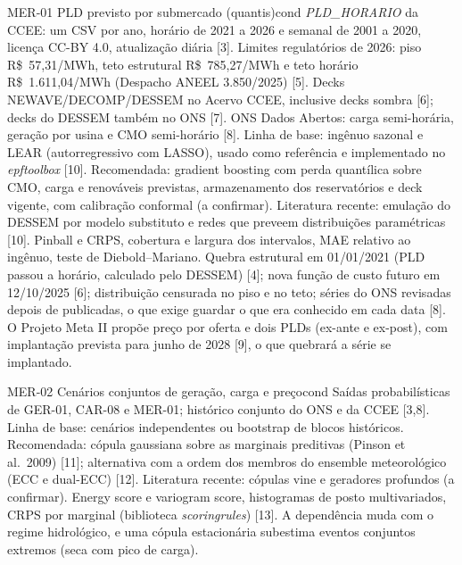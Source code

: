 \begin{ficha}{MER-01 \textperiodcentered{} PLD previsto por submercado (quantis)}{cond}
 \emph{PLD\_HORARIO} da CCEE: um CSV por ano, horário de 2021 a
2026 e semanal de 2001 a 2020, licença CC-BY 4.0, atualização diária [3].
Limites regulatórios de 2026: piso R\$~57,31/MWh, teto estrutural
R\$~785,27/MWh e teto horário R\$~1.611,04/MWh (Despacho ANEEL 3.850/2025)
[5]. Decks NEWAVE/DECOMP/DESSEM no Acervo CCEE, inclusive decks sombra [6];
decks do DESSEM também no ONS [7]. ONS Dados Abertos: carga semi-horária,
geração por usina e CMO semi-horário [8].
 Linha de base: ingênuo sazonal e LEAR (autorregressivo
com LASSO), usado como referência e implementado no \emph{epftoolbox} [10].
Recomendada: gradient boosting com perda quantílica sobre CMO, carga e
renováveis previstas, armazenamento dos reservatórios e deck vigente, com
calibração conformal (a confirmar). Literatura recente: emulação do DESSEM por
modelo substituto e redes que preveem distribuições paramétricas [10].
 Pinball e CRPS, cobertura e largura dos intervalos, MAE
relativo ao ingênuo, teste de Diebold--Mariano.
 Quebra estrutural em 01/01/2021 (PLD passou a horário,
calculado pelo DESSEM) [4]; nova função de custo futuro em 12/10/2025 [6];
distribuição censurada no piso e no teto; séries do ONS revisadas depois de
publicadas, o que exige guardar o que era conhecido em cada data [8]. O
Projeto Meta II propõe preço por oferta e dois PLDs (ex-ante e ex-post), com
implantação prevista para junho de 2028 [9], o que quebrará a série se implantado.
\end{ficha}

\begin{ficha}{MER-02 \textperiodcentered{} Cenários conjuntos de geração, carga e preço}{cond}
 Saídas probabilísticas de GER-01, CAR-08 e MER-01; histórico
conjunto do ONS e da CCEE [3,8].
 Linha de base: cenários independentes ou bootstrap de
blocos históricos. Recomendada: cópula gaussiana sobre as marginais
preditivas (Pinson et al.\ 2009) [11]; alternativa com a ordem dos membros do
ensemble meteorológico (ECC e dual-ECC) [12]. Literatura recente: cópulas vine e
geradores profundos (a confirmar).
 Energy score e variogram score, histogramas de posto
multivariados, CRPS por marginal (biblioteca \emph{scoringrules}) [13].
 A dependência muda com o regime hidrológico, e uma cópula
estacionária subestima eventos conjuntos extremos (seca com pico de carga).
\end{ficha}

